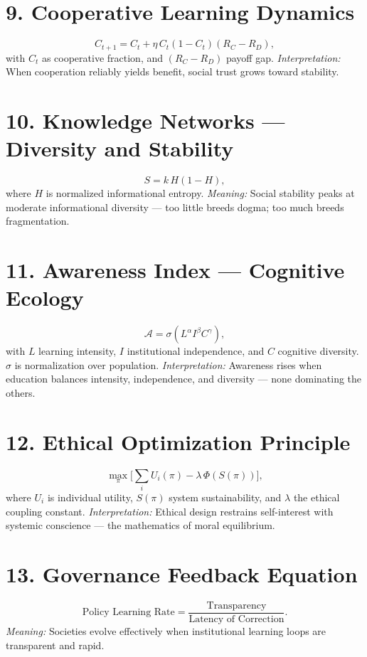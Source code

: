 \documentclass[12pt,twoside]{book}
\begin{document}
\section*{9. Cooperative Learning Dynamics}
\[
C_{t+1} = C_t + \eta\, C_t(1-C_t)(R_C - R_D),
\]
with \(C_t\) as cooperative fraction, and \((R_C-R_D)\) payoff gap.  
\emph{Interpretation:} When cooperation reliably yields benefit, social trust grows toward stability.

\section*{10. Knowledge Networks — Diversity and Stability}
\[
S = k\, H(1-H),
\]
where \(H\) is normalized informational entropy.  
\emph{Meaning:} Social stability peaks at moderate informational diversity — too little breeds dogma; too much breeds fragmentation.

\section*{11. Awareness Index — Cognitive Ecology}
\[
\mathcal{A} = \sigma(L^\alpha I^\beta C^\gamma),
\]
with \(L\) learning intensity, \(I\) institutional independence, and \(C\) cognitive diversity.  
\(\sigma\) is normalization over population.  
\emph{Interpretation:} Awareness rises when education balances intensity, independence, and diversity — none dominating the others.

\section*{12. Ethical Optimization Principle}
\[
\max_{\pi}\Bigg[\sum_i U_i(\pi) - \lambda\,\Phi(S(\pi))\Bigg],
\]
where \(U_i\) is individual utility, \(S(\pi)\) system sustainability, and \(\lambda\) the ethical coupling constant.  
\emph{Interpretation:} Ethical design restrains self-interest with systemic conscience — the mathematics of moral equilibrium.

\section*{13. Governance Feedback Equation}
\[
\text{Policy Learning Rate} = 
\frac{\text{Transparency}}{\text{Latency of Correction}}.
\]
\emph{Meaning:} Societies evolve effectively when institutional learning loops are transparent and rapid.
\end{document}
